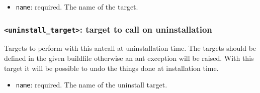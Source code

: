 \begin{itemize}
    \item \texttt{name}: required. The name of the target.
\end{itemize}

\subsubsection{\label{tag:antuninsttarget}\texttt{<uninstall\_target>}: target to call on uninstallation}
Targets to perform with this antcall at uninstallation time. The
targets should be defined in the given buildfile otherwise an ant
exception will be raised. With this target it will be possible
to undo the things done at installation time.
\begin{itemize}
    \item \texttt{name}: required. The name of the uninstall target.
\end{itemize}


